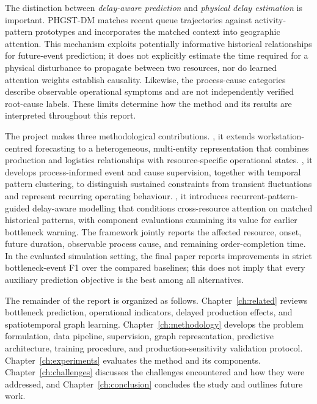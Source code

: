 The distinction between \emph{delay-aware prediction} and \emph{physical delay estimation} is important. PHGST-DM matches recent queue trajectories against activity-pattern prototypes and incorporates the matched context into geographic attention. This mechanism exploits potentially informative historical relationships for future-event prediction; it does not explicitly estimate the time required for a physical disturbance to propagate between two resources, nor do learned attention weights establish causality. Likewise, the process-cause categories describe observable operational symptoms and are not independently verified root-cause labels. These limits determine how the method and its results are interpreted throughout this report.

The project makes three methodological contributions. , it extends workstation-centred forecasting to a heterogeneous, multi-entity representation that combines production and logistics relationships with resource-specific operational states. , it develops process-informed event and cause supervision, together with temporal pattern clustering, to distinguish sustained constraints from transient fluctuations and represent recurring operating behaviour. , it introduces recurrent-pattern-guided delay-aware modelling that conditions cross-resource attention on matched historical patterns, with component evaluations examining its value for earlier bottleneck warning. The framework jointly reports the affected resource, onset, future duration, observable process cause, and remaining order-completion time. In the evaluated simulation setting, the final paper reports improvements in strict bottleneck-event F1 over the compared baselines; this does not imply that every auxiliary prediction objective is the best among all alternatives.

The remainder of the report is organized as follows. Chapter~\ref{ch:related} reviews bottleneck prediction, operational indicators, delayed production effects, and spatiotemporal graph learning. Chapter~\ref{ch:methodology} develops the problem formulation, data pipeline, supervision, graph representation, predictive architecture, training procedure, and production-sensitivity validation protocol. Chapter~\ref{ch:experiments} evaluates the method and its components. Chapter~\ref{ch:challenges} discusses the challenges encountered and how they were addressed, and Chapter~\ref{ch:conclusion} concludes the study and outlines future work.
